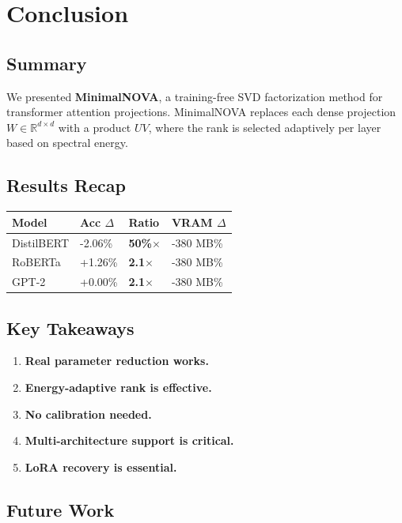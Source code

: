 
\section{Conclusion}

\subsection{Summary}

We presented \textbf{MinimalNOVA}, a training-free SVD factorization method for 
transformer attention projections. MinimalNOVA replaces each dense projection 
$W \in \mathbb{R}^{d \times d}$ with a product $U V$, where the rank is 
selected adaptively per layer based on spectral energy.

\subsection{Results Recap}

\begin{table}[H]
\centering
\small
\begin{tabular}{llll}
\toprule
\textbf{Model} & \textbf{Acc $\Delta$} & \textbf{Ratio} & \textbf{VRAM $\Delta$} \\
\midrule
DistilBERT & -2.06\% & \textbf{50\%$\times$} & -380 MB\% \\
RoBERTa & +1.26\% & \textbf{2.1$\times$} & -380 MB\% \\
GPT-2 & +0.00\% & \textbf{2.1$\times$} & -380 MB\% \\
\bottomrule
\end{tabular}
\end{table}

\subsection{Key Takeaways}

\begin{enumerate}
\item \textbf{Real parameter reduction works.}
\item \textbf{Energy-adaptive rank is effective.}
\item \textbf{No calibration needed.}
\item \textbf{Multi-architecture support is critical.}
\item \textbf{LoRA recovery is essential.}

\end{enumerate}
\subsection{Future Work}

